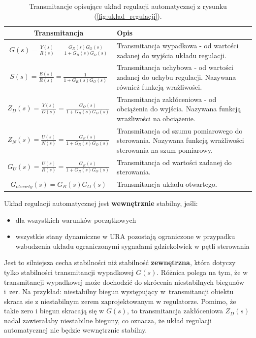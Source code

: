 \documentclass{article}
\begin{document}
    \begin{table}[H]
        \centering
        \begin{tabular}{|c|p{10cm}|}
            \hline
            \textbf{Transmitancja} & \textbf{Opis} \\
            \hline
            $G(s) = \frac{Y(s)}{R(s)} = \frac{G_{R}(s)G_{O}(s)}{1 + G_{R}(s)G_{O}(s)}$ & Transmitancja wypadkowa - od wartości zadanej do wyjścia układu regulacji.\\
            \hline
            $S(s) = \frac{E(s)}{R(s)} = \frac{1}{1 + G_{R}(s)G_{O}(s)}$ & Transmitancja uchybowa - od wartości zadanej do uchybu regulacji. Nazywana również funkcją wrażliwości.\\
            \hline
            $Z_{D}(s) = \frac{Y(s)}{D(s)} = \frac{G_{O}(s)}{1 + G_{R}(s)G_{O}(s)}$ & Transmitancja zakłóceniowa - od obciążenia do wyjścia. Nazywana funkcją wrażliwości na obciążenie.\\
            \hline
            $Z_{N}(s) = \frac{U(s)}{N(s)} = \frac{G_{R}(s)}{1 + G_{R}(s)G_{O}(s)}$ & Transmitancja od szumu pomiarowego do sterowania. Nazywana funkcją wrażliwości sterowania na szum pomiarowy.\\
            \hline
            $G_{U}(s) = \frac{U(s)}{R(s)} = \frac{G_{R}(s)}{1 + G_{R}(s)G_{O}(s)}$ & Transmitancja od wartości zadanej do sterowania.\\
            \hline
            $G_{otwarty}(s) = G_{R}(s)G_{O}(s)$ & Transmitancja układu otwartego.\\
            \hline
        \end{tabular}
        \caption{Transmitancje opisujące układ regulacji automatycznej z rysunku (\ref{fig:uklad_regulacji}).}
        \label{tab:uklad_regulacji_transmitancje}
    \end{table}

    Układ regulacji automatycznej jest \textbf{wewnętrznie} stabilny, jeśli:
    \begin{itemize}
        \item dla wszystkich warunków początkowych
        \item wszystkie stany dynamiczne w URA pozostają ograniczone w przypadku wzbudzenia układu ograniczonymi sygnałami gdziekolwiek w pętli sterowania
    \end{itemize}
    Jest to silniejsza cecha stabilności niż stabilność \textbf{zewnętrzna}, która dotyczy tylko stabilności transmitancji wypadkowej $G(s)$.
    Różnica  polega na tym, że w transmitancji wypadkowej może dochodzić do skrócenia niestabilnych biegunów i~zer. Na przykład: niestabilny biegun występujący w~transmitancji obiektu skraca sie z niestabilnym zerem zaprojektowanym w regulatorze.
    Pomimo, że takie zero i biegun skracają się w $G(s)$, to transmitancja zakłóceniowa $Z_{D}(s)$ nadal zawierałaby niestabilne bieguny, co oznacza, że układ regulacji automatycznej nie będzie wewnętrznie stabilny.  
\end{document}
